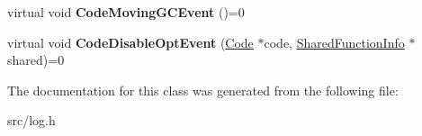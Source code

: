 \begin{DoxyCompactItemize}
\item 
\hypertarget{classv8_1_1internal_1_1_code_event_listener_a26220ae93a543e9ead1267ee1d91882b}{}virtual void {\bfseries Code\+Moving\+G\+C\+Event} ()=0\label{classv8_1_1internal_1_1_code_event_listener_a26220ae93a543e9ead1267ee1d91882b}

\item 
\hypertarget{classv8_1_1internal_1_1_code_event_listener_a53cb1596ba73bdce284d510805020de7}{}virtual void {\bfseries Code\+Disable\+Opt\+Event} (\hyperlink{classv8_1_1internal_1_1_code}{Code} $\ast$code, \hyperlink{classv8_1_1internal_1_1_shared_function_info}{Shared\+Function\+Info} $\ast$shared)=0\label{classv8_1_1internal_1_1_code_event_listener_a53cb1596ba73bdce284d510805020de7}

\end{DoxyCompactItemize}


The documentation for this class was generated from the following file\+:\begin{DoxyCompactItemize}
\item 
src/log.\+h\end{DoxyCompactItemize}

